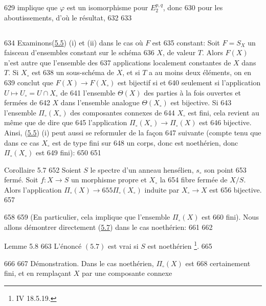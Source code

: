    629	implique que $\varphi$ est un isomorphisme pour $E^{p,q}_2$, donc
   630	pour les aboutissements, d'où le résultat, 	
   632	\setcounter{subsection}{5}
   633	\subsection{}
   634	Examinons\pageoriginale (\hyperref[XII.cor5.5]{5.5}) (i) et (ii) dans le cas où $F$ est
   635	constant: Soit $F=S_X$ un faisceau d'ensembles constant sur le schéma
   636	$X$, de valeur $T$. Alors $F(X)$ n'est autre que l'ensemble des
   637	applications localement constantes de $X$ dans $T$. Si $X_{\circ}$ est
   638	un sous-schéma de $X$, et si $T$ a au moins deux éléments, on en
   639	conclut que $F(X)\rightarrow F(X_{\circ})$ est bijectif si et
   640	seulement si l'application $U\mapsto U_{\circ}=U\cap X_{\circ}$ de
   641	l'ensemble $\Theta(X)$ des parties à la fois ouvertes et fermées de
   642	$X$ dans l'ensemble analogue $\Theta(X_{\circ})$ est bijective. Si
   643	l'ensemble $\Pi_{\circ}(X_{\circ})$ des composantes connexes de
   644	$X_{\circ}$ est fini, cela revient au même que de dire que
   645	l'application $\Pi_{\circ}(X_{\circ})\rightarrow \Pi_{\circ}(X)$ est
   646	bijective. Ainsi, (\hyperref[XII.cor5.5]{5.5}) (i) peut aussi se reformuler de la façon
   647	suivante (compte tenu que dans ce cas $X_{\circ}$ est de type fini sur
   648	un corps, donc est noethérien, donc $\Pi_{\circ}(X_{\circ})$ est
   649	fini):
   650	
   651	\begin{enonce*}{Corollaire 5.7}
   652	Soient $S$ le spectre d'un anneau hensélien, $s_{\circ}$ son point
   653	fermé. Soit $f:X\rightarrow S$ un morphisme propre et $X_{\circ}$ la
   654	fibre fermée de $X/S$. Alors l'application $\Pi_{\circ}(X)\rightarrow
   655	\Pi_{\circ}(X_{\circ})$ induite par $X_{\circ}\rightarrow X$ est
   656	bijective.
   657	\end{enonce*}
   658	
   659	(En particulier, cela implique que l'ensemble $\Pi_{\circ}(X)$ est
   660	fini). Nous allons démontrer directement (\hyperref[XII.cor5.7]{5.7}) dans le cas noethérien:
   661	
   662	\begin{enonce*}{Lemme 5.8}
   663	L'énoncé $(5.7)$ est vrai si $S$ est noethérien \footnote[1]{\Cf {}	  IV 18.5.19.}.
   665	\end{enonce*}
   666	
   667	Démonstration. Dans le cas noethérien, $\Pi_{\circ}(X)$ est
   668	certainement fini, et en remplaçant $X$ par une composante connexe
